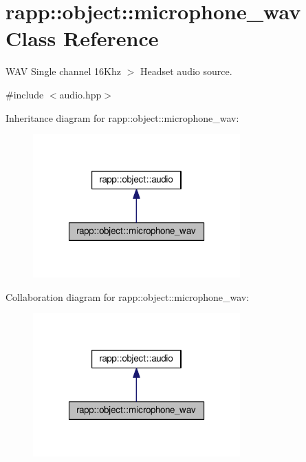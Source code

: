 \hypertarget{classrapp_1_1object_1_1microphone__wav}{\section{rapp\-:\-:object\-:\-:microphone\-\_\-wav Class Reference}
\label{classrapp_1_1object_1_1microphone__wav}
}


W\-A\-V Single channel 16\-Khz $>$ Headset audio source.  




{\ttfamily \#include $<$audio.\-hpp$>$}



Inheritance diagram for rapp\-:\-:object\-:\-:microphone\-\_\-wav\-:
\nopagebreak
\begin{figure}[H]
\begin{center}
\leavevmode
\includegraphics[width=226pt]{classrapp_1_1object_1_1microphone__wav__inherit__graph}
\end{center}
\end{figure}


Collaboration diagram for rapp\-:\-:object\-:\-:microphone\-\_\-wav\-:
\nopagebreak
\begin{figure}[H]
\begin{center}
\leavevmode
\includegraphics[width=226pt]{classrapp_1_1object_1_1microphone__wav__coll__graph}
\end{center}
\end{figure}
